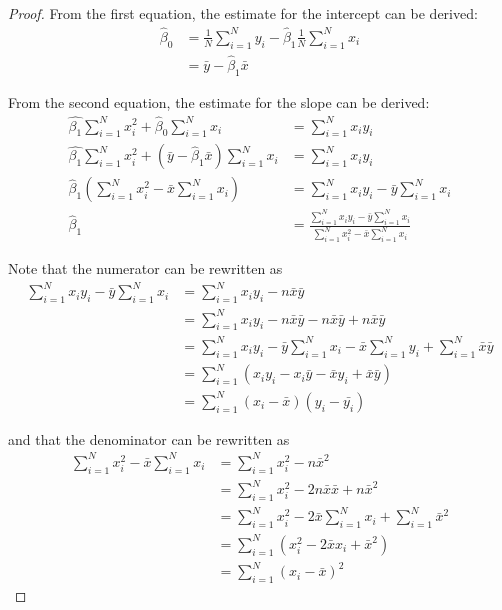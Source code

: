 \begin{proof}
From the first equation, the estimate for the intercept can be derived:
\begin{align*}
\hat{\beta}_0   &=\frac{1}{N}\sum_{i=1}^{N}y_i-\hat{\beta}_1\frac{1}{N}\sum_{i=1}^{N}x_i \\
                &=\bar{y}-\hat{\beta}_1\bar{x}
\end{align*}

\clearpage
From the second equation, the estimate for the slope can be derived:
\begin{align*}
\hat{\beta_1}\sum_{i=1}^{N}x_i^2+\hat{\beta}_0\sum_{i=1}^{N}x_i &=\sum_{i=1}^{N}x_iy_i \\
\hat{\beta_1}\sum_{i=1}^{N}x_i^2+(\bar{y}-\hat{\beta}_1\bar{x})\sum_{i=1}^{N}x_i &=\sum_{i=1}^{N}x_iy_i \\
\hat{\beta}_1\left(\sum_{i=1}^{N}x_i^2-\bar{x}\sum_{i=1}^{N}x_i\right)  &= \sum_{i=1}^{N}x_iy_i-\bar{y}\sum_{i=1}^{N}x_i \\
\hat{\beta}_1   &=\frac{\sum_{i=1}^{N}x_iy_i-\bar{y}\sum_{i=1}^{N}x_i}{\sum_{i=1}^{N}x_i^2-\bar{x}\sum_{i=1}^{N}x_i}
\end{align*}

Note that the numerator can be rewritten as
\begin{align*}
\sum_{i=1}^{N}x_iy_i-\bar{y}\sum_{i=1}^{N}x_i   &= \sum_{i=1}^{N}x_iy_i-n\bar{x}\bar{y} \\
    &= \sum_{i=1}^{N}x_iy_i-n\bar{x}\bar{y}-n\bar{x}\bar{y}+n\bar{x}\bar{y} \\
    &= \sum_{i=1}^{N}x_iy_i-\bar{y}\sum_{i=1}^{N}x_i-\bar{x}\sum_{i=1}^{N}y_i+\sum_{i=1}^{N}\bar{x}\bar{y} \\
    &= \sum_{i=1}^{N}(x_iy_i-x_i\bar{y}-\bar{x}y_i+\bar{x}\bar{y}) \\
    &= \sum_{i=1}^{N}(x_i-\bar{x})(y_i-\bar{y_i})
\end{align*}

and that the denominator can be rewritten as
\begin{align*}
\sum_{i=1}^{N}x_i^2-\bar{x}\sum_{i=1}^{N}x_i    &= \sum_{i=1}^{N}x_i^2-n\bar{x}^2 \\
    &=\sum_{i=1}^{N}x_i^2-2n\bar{x}\bar{x}+n\bar{x}^2 \\
    &=\sum_{i=1}^{N}x_i^2-2\bar{x}\sum_{i=1}^{N}x_i+\sum_{i=1}^{N}\bar{x}^2 \\
    &=\sum_{i=1}^{N}(x_i^2-2\bar{x}x_i+\bar{x}^2)\\
    &=\sum_{i=1}^{N}(x_i-\bar{x})^2
\end{align*}


\end{proof}
